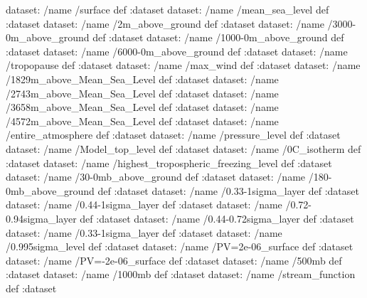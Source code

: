 \begin{ingrid}

dataset: /name /surface def :dataset
dataset: /name /mean_sea_level def :dataset
dataset: /name /2m_above_ground def :dataset
dataset: /name /3000-0m_above_ground def :dataset
dataset: /name /1000-0m_above_ground def :dataset
dataset: /name /6000-0m_above_ground def :dataset
dataset: /name /tropopause def :dataset
dataset: /name /max_wind def :dataset
dataset: /name /1829m_above_Mean_Sea_Level def :dataset
dataset: /name /2743m_above_Mean_Sea_Level def :dataset
dataset: /name /3658m_above_Mean_Sea_Level def :dataset
dataset: /name /4572m_above_Mean_Sea_Level def :dataset
dataset: /name /entire_atmosphere def :dataset
dataset: /name /pressure_level def :dataset
dataset: /name /Model_top_level def :dataset
dataset: /name /0C_isotherm def :dataset
dataset: /name /highest_tropospheric_freezing_level def :dataset
dataset: /name /30-0mb_above_ground def :dataset
dataset: /name /180-0mb_above_ground def :dataset
dataset: /name /0.33-1sigma_layer def :dataset
dataset: /name /0.44-1sigma_layer def :dataset
dataset: /name /0.72-0.94sigma_layer def :dataset
dataset: /name /0.44-0.72sigma_layer def :dataset
dataset: /name /0.33-1sigma_layer def :dataset
dataset: /name /0.995sigma_level def :dataset
dataset: /name /PV=2e-06_surface def :dataset
dataset: /name /PV=-2e-06_surface def :dataset
dataset: /name /500mb def :dataset
dataset: /name /1000mb def :dataset
dataset: /name /stream_function def :dataset

\end{ingrid}
